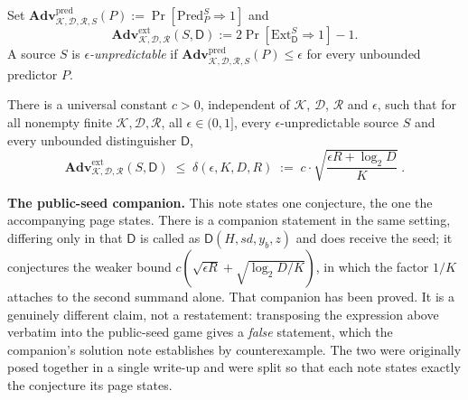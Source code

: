 \documentclass{conjura-conjecture}
\newcommand{\Adv}{\mathbf{Adv}}
\newcommand{\Pred}{\mathrm{Pred}}
\newcommand{\Ext}{\mathrm{Ext}}
\newcommand{\pred}{\mathrm{pred}}
\newcommand{\ext}{\mathrm{ext}}
\newcommand{\sd}{\mathit{sd}}
\newcommand{\calK}{\mathcal{K}}
\newcommand{\calD}{\mathcal{D}}
\newcommand{\calR}{\mathcal{R}}
\begin{document}
\begin{definition}\label{def:games}
Set $\Adv^{\pred}_{\calK,\calD,\calR,S}(P) := \Pr[\Pred^{S}_{P} \Rightarrow 1]$ and
\[
  \Adv^{\ext}_{\calK,\calD,\calR}(S,\mathsf{D}) := 2\Pr[\Ext^{S}_{\mathsf{D}} \Rightarrow 1] - 1 .
\]
A source $S$ is \emph{$\epsilon$-unpredictable} if
$\Adv^{\pred}_{\calK,\calD,\calR,S}(P) \le \epsilon$ for every unbounded predictor $P$.
\end{definition}

\begin{conjecture}\label{conj:main}
There is a universal constant $c > 0$, independent of $\calK$, $\calD$, $\calR$ and $\epsilon$, such
that for all nonempty finite $\calK, \calD, \calR$, all $\epsilon \in (0,1]$, every
$\epsilon$-unpredictable source $S$ and every unbounded distinguisher $\mathsf{D}$,
\[
  \Adv^{\ext}_{\calK,\calD,\calR}(S,\mathsf{D})
  \;\le\; \delta(\epsilon, K, D, R)
  \;:=\; c \cdot \sqrt{\frac{\epsilon R + \log_2 D}{K}} \; .
\]
\end{conjecture}

\bigskip
\noindent\textbf{The public-seed companion.}
This note states one conjecture, the one the accompanying page states. There is a companion
statement in the same setting, differing only in that $\mathsf{D}$ is called as
$\mathsf{D}(H, \sd, y_b, z)$ and does receive the seed; it conjectures the weaker bound
$c(\sqrt{\epsilon R} + \sqrt{\log_2 D / K})$, in which the factor $1/K$ attaches to the second
summand alone. That companion has been proved. It is a genuinely different claim, not a
restatement: transposing the expression above verbatim into the public-seed game gives a
\emph{false} statement, which the companion's solution note establishes by counterexample. The two
were originally posed together in a single write-up and were split so that each note states exactly
the conjecture its page states.
\end{document}
